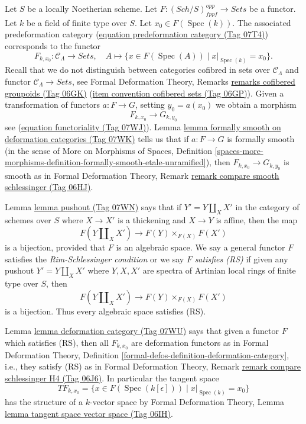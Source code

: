 \documentclass{amsart}
\theoremstyle{plain}
\theoremstyle{definition}
\theoremstyle{remark}
\numberwithin{equation}{subsection}
\def\Spec{\mathop{\mathrm{Spec}}}
\def\Sch{\mathit{Sch}}
\begin{document}
\medskip\noindent
Let $S$ be a locally Noetherian scheme. Let
$F : (\Sch/S)_{fppf}^{opp} \to \textit{Sets}$ be a functor. Let $k$ be
a field of finite type over $S$. Let $x_0 \in F(\Spec(k))$.
The associated predeformation category (\href{https://stacks.math.columbia.edu/tag/07T4}{equation predeformation category (Tag 07T4)})
corresponds to the functor
$$
F_{k, x_0} : \mathcal{C}_\Lambda \longrightarrow \textit{Sets},
\quad
A \longmapsto \{x \in F(\Spec(A)) \mid x|_{\Spec(k)} = x_0 \}.
$$
Recall that we do not distinguish between
categories cofibred in sets over $\mathcal{C}_\Lambda$
and functor $\mathcal{C}_\Lambda \to \textit{Sets}$,
see Formal Deformation Theory, Remarks
\href{https://stacks.math.columbia.edu/tag/06GK}{remarks cofibered groupoids (Tag 06GK)}
(\href{https://stacks.math.columbia.edu/tag/06GP}{item convention cofibered sets (Tag 06GP)}).
Given a transformation of functors $a : F \to G$, setting
$y_0 = a(x_0)$ we obtain a morphism
$$
F_{k, x_0} \longrightarrow G_{k, y_0}
$$
see (\href{https://stacks.math.columbia.edu/tag/07WJ}{equation functoriality (Tag 07WJ)}).
Lemma \href{https://stacks.math.columbia.edu/tag/07WK}{lemma formally smooth on deformation categories (Tag 07WK)} tells us that if
$a : F \to G$ is formally smooth (in the sense of
More on Morphisms of Spaces, Definition
\ref{spaces-more-morphisms-definition-formally-smooth-etale-unramified}), then
$F_{k, x_0} \longrightarrow G_{k, y_0}$ is smooth as
in Formal Deformation Theory, Remark
\href{https://stacks.math.columbia.edu/tag/06HJ}{remark compare smooth schlessinger (Tag 06HJ)}.

\medskip\noindent
Lemma \href{https://stacks.math.columbia.edu/tag/07WN}{lemma pushout (Tag 07WN)} says that if $Y' = Y \amalg_X X'$ in the
category of schemes over $S$ where $X \to X'$ is a thickening and
$X \to Y$ is affine, then the map
$$
F(Y \amalg_X X') \to F(Y) \times_{F(X)} F(X')
$$
is a bijection, provided that $F$ is an algebraic space.
We say a general functor $F$ satisfies the {\it Rim-Schlessinger condition}
or we say $F$ {\it satisfies (RS)} if given any
pushout $Y' = Y \amalg_X X'$ where $Y, X, X'$ are spectra of Artinian
local rings of finite type over $S$, then
$$
F(Y \amalg_X X') \to F(Y) \times_{F(X)} F(X')
$$
is a bijection. Thus every algebraic space satisfies (RS).

\medskip\noindent
Lemma \href{https://stacks.math.columbia.edu/tag/07WU}{lemma deformation category (Tag 07WU)} says that
given a functor $F$ which satisfies (RS), then all $F_{k, x_0}$
are deformation functors as in
Formal Deformation Theory, Definition
\ref{formal-defos-definition-deformation-category}, i.e., they satisfy
(RS) as in
Formal Deformation Theory, Remark
\href{https://stacks.math.columbia.edu/tag/06J6}{remark compare schlessinger H4 (Tag 06J6)}.
In particular the tangent space
$$
TF_{k, x_0} = \{x \in F(\Spec(k[\epsilon])) \mid x|_{\Spec(k)} = x_0\}
$$
has the structure of a $k$-vector space by Formal Deformation Theory,
Lemma \href{https://stacks.math.columbia.edu/tag/06IH}{lemma tangent space vector space (Tag 06IH)}.
\end{document}
